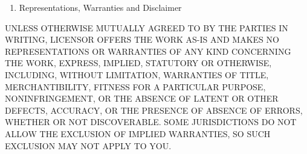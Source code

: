\documentclass[letterpaper,10pt,english]{manual}
\begin{document}
\begin{enumerate}
\begin{enumerate}
\end{enumerate}

\item {} 
Representations, Warranties and Disclaimer

\end{enumerate}

UNLESS OTHERWISE MUTUALLY AGREED TO BY THE PARTIES IN WRITING, LICENSOR OFFERS THE WORK AS-IS AND MAKES NO REPRESENTATIONS OR WARRANTIES OF ANY KIND CONCERNING THE WORK, EXPRESS, IMPLIED, STATUTORY OR OTHERWISE, INCLUDING, WITHOUT LIMITATION, WARRANTIES OF TITLE, MERCHANTIBILITY, FITNESS FOR A PARTICULAR PURPOSE, NONINFRINGEMENT, OR THE ABSENCE OF LATENT OR OTHER DEFECTS, ACCURACY, OR THE PRESENCE OF ABSENCE OF ERRORS, WHETHER OR NOT DISCOVERABLE. SOME JURISDICTIONS DO NOT ALLOW THE EXCLUSION OF IMPLIED WARRANTIES, SO SUCH EXCLUSION MAY NOT APPLY TO YOU.
\end{document}
